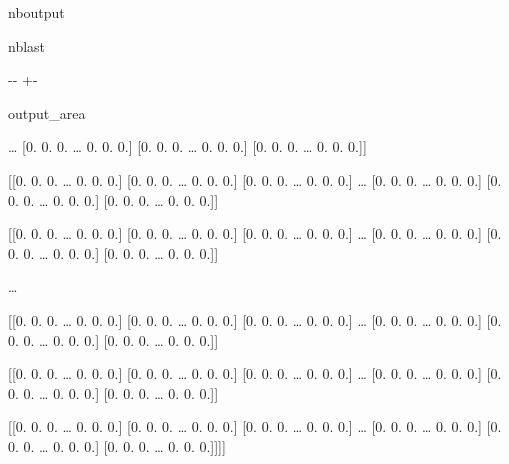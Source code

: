 \documentclass[letterpaper,10pt,english]{sphinxmanual}
\begin{document}
\begin{sphinxuseclass}{nboutput}
\begin{sphinxuseclass}{nblast}
{

\kern-\sphinxverbatimsmallskipamount\kern-\baselineskip
\kern+\FrameHeightAdjust\kern-\fboxrule
\vspace{\nbsphinxcodecellspacing}

\begin{sphinxuseclass}{output_area}
\begin{sphinxuseclass}{}


\begin{sphinxVerbatim}[commandchars=\\\{\}]
[[[[0. 0. 0. {\ldots} 0. 0. 0.]
   [0. 0. 0. {\ldots} 0. 0. 0.]
   [0. 0. 0. {\ldots} 0. 0. 0.]
   {\ldots}
   [0. 0. 0. {\ldots} 0. 0. 0.]
   [0. 0. 0. {\ldots} 0. 0. 0.]
   [0. 0. 0. {\ldots} 0. 0. 0.]]

  [[0. 0. 0. {\ldots} 0. 0. 0.]
   [0. 0. 0. {\ldots} 0. 0. 0.]
   [0. 0. 0. {\ldots} 0. 0. 0.]
   {\ldots}
   [0. 0. 0. {\ldots} 0. 0. 0.]
   [0. 0. 0. {\ldots} 0. 0. 0.]
   [0. 0. 0. {\ldots} 0. 0. 0.]]

  [[0. 0. 0. {\ldots} 0. 0. 0.]
   [0. 0. 0. {\ldots} 0. 0. 0.]
   [0. 0. 0. {\ldots} 0. 0. 0.]
   {\ldots}
   [0. 0. 0. {\ldots} 0. 0. 0.]
   [0. 0. 0. {\ldots} 0. 0. 0.]
   [0. 0. 0. {\ldots} 0. 0. 0.]]

  {\ldots}

  [[0. 0. 0. {\ldots} 0. 0. 0.]
   [0. 0. 0. {\ldots} 0. 0. 0.]
   [0. 0. 0. {\ldots} 0. 0. 0.]
   {\ldots}
   [0. 0. 0. {\ldots} 0. 0. 0.]
   [0. 0. 0. {\ldots} 0. 0. 0.]
   [0. 0. 0. {\ldots} 0. 0. 0.]]

  [[0. 0. 0. {\ldots} 0. 0. 0.]
   [0. 0. 0. {\ldots} 0. 0. 0.]
   [0. 0. 0. {\ldots} 0. 0. 0.]
   {\ldots}
   [0. 0. 0. {\ldots} 0. 0. 0.]
   [0. 0. 0. {\ldots} 0. 0. 0.]
   [0. 0. 0. {\ldots} 0. 0. 0.]]

  [[0. 0. 0. {\ldots} 0. 0. 0.]
   [0. 0. 0. {\ldots} 0. 0. 0.]
   [0. 0. 0. {\ldots} 0. 0. 0.]
   {\ldots}
   [0. 0. 0. {\ldots} 0. 0. 0.]
   [0. 0. 0. {\ldots} 0. 0. 0.]
   [0. 0. 0. {\ldots} 0. 0. 0.]]]]
\end{sphinxVerbatim}



\end{sphinxuseclass}
\end{sphinxuseclass}
}

\end{sphinxuseclass}
\end{sphinxuseclass}
\end{document}
